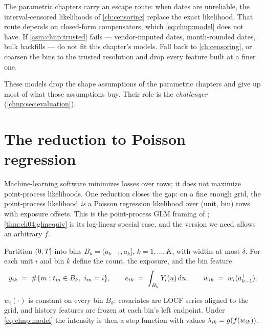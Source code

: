 \begin{warning}\label{warn:chnp:dates}
The parametric chapters carry an escape route: when dates are
unreliable, the interval-censored likelihoods of \cref{ch:censoring}
replace the exact likelihood. That route depends on closed-form
compensators, which \cref{eq:chnp:model} does not have. If
\cref{asm:chnp:trusted} fails --- vendor-imputed dates, month-rounded
dates, bulk backfills --- do not fit this chapter's models. Fall back to
\cref{ch:censoring}, or coarsen the bins to the trusted resolution and
drop every feature built at a finer one.
\end{warning}

These models drop the shape assumptions of the parametric chapters and
give up most of what those assumptions buy. Their role is the
\emph{challenger} (\cref{chnp:sec:evaluation}).

\section{The reduction to Poisson regression}\label{chnp:sec:reduction}

Machine-learning software minimizes losses over rows; it does not
maximize point-process likelihoods. One reduction closes the gap: on a
fine enough grid, the point-process likelihood \emph{is} a Poisson
regression likelihood over (unit, bin) rows with exposure offsets. This
is the point-process GLM framing of \citet{truccolo2005};
\cref{thm:ch04:glmequiv} is its log-linear special case, and the version
we need allows an arbitrary $f$.

Partition $(0,T]$ into bins $B_k = (a_{k-1}, a_k]$, $k = 1,\dots,K$,
with widths at most $\delta$. For each unit $i$ and bin $k$ define the
count, the exposure, and the bin feature
\begin{equation}\label{eq:chnp:rows}
y_{ik} \;=\; \#\{m : t_m \in B_k,\ i_m = i\},
\qquad
e_{ik} \;=\; \int_{B_k} Y_i(u) \,\mathrm{d} u,
\qquad
w_{ik} \;=\; w_i(a_{k-1}^{+}) .
\end{equation}

\begin{assumption}\label{asm:chnp:pwconst}
$w_i(\cdot)$ is constant on every bin $B_k$: covariates are LOCF series
aligned to the grid, and history features are frozen at each bin's left
endpoint. Under \cref{eq:chnp:model} the intensity is then a step
function with values $\lambda_{ik} = g(f(w_{ik}))$.
\end{assumption}

